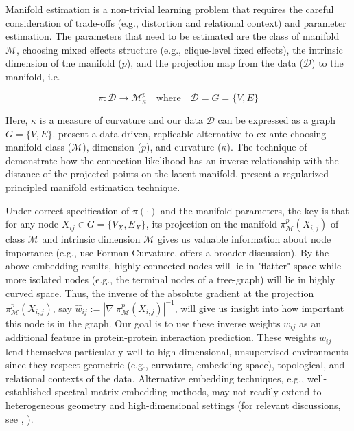 \documentclass[twoside,11pt]{article}
\begin{document}
Manifold estimation is a non-trivial learning problem that requires the careful consideration of trade-offs (e.g., distortion and relational context) and parameter estimation. The parameters that need to be estimated are the class of manifold $\mathcal{M}$, choosing mixed effects structure (e.g., clique-level fixed effects), the intrinsic dimension of the manifold ($p$), and the projection map from the data ($\mathcal{D}$) to the manifold, i.e. 

\[\pi: \mathcal{D} \rightarrow \mathcal{M}_\kappa^p \quad \text{where} \quad \mathcal{D} = G = \{V,E\}\]

Here, $\kappa$ is a measure of curvature and our data $\mathcal{D}$ can be expressed as a graph $G = \{V,E\}$. \citet{lubold_etal_2022} present a data-driven, replicable alternative to ex-ante choosing manifold class ($\mathcal{M}$), dimension ($p$), and curvature ($\kappa$). The technique of \citet{lubold_etal_2022} demonstrate how the connection likelihood has an inverse relationship with the distance of the projected points on the latent manifold. \citet{meng_eloyan_2021} present a regularized principled manifold estimation technique. 

Under correct specification of $\pi(\cdot)$ and the manifold parameters, the key is that for any node $X_{ij} \in G = \{V_X, E_X\}$, its projection on the manifold $\pi_\mathcal{M}^p(X_{i,j})$ of class $\mathcal{M}$ and intrinsic dimension $\mathcal{M}$ gives us valuable information about node importance (e.g., \citet{yamada_2025} use Forman Curvature, \citet{xu_2020} offers a broader discussion). By the above embedding results, highly connected nodes will lie in "flatter" space while more isolated nodes (e.g., the terminal nodes of a tree-graph) will lie in highly curved space. Thus, the inverse of the absolute gradient at the projection $\pi_\mathcal{M}^p(X_{i,j})$, say $\hat{w}_{ij} := |\nabla~\pi_\mathcal{M}^p(X_{i,j})|^{-1}$, will give us insight into how important this node is in the graph. Our goal is to use these inverse weights $w_{ij}$ as an additional feature in protein-protein interaction prediction. These weights $w_{ij}$ lend themselves particularly well to high-dimensional, unsupervised environments since they respect geometric (e.g., curvature, embedding space), topological, and relational contexts of the data. Alternative embedding techniques, e.g., well-established spectral matrix embedding methods, may not readily extend to heterogeneous geometry and high-dimensional settings (for relevant discussions, see \citet{baptista_etal_2023}, \citet{rubin-delanchy_2021}). 
\end{document}

